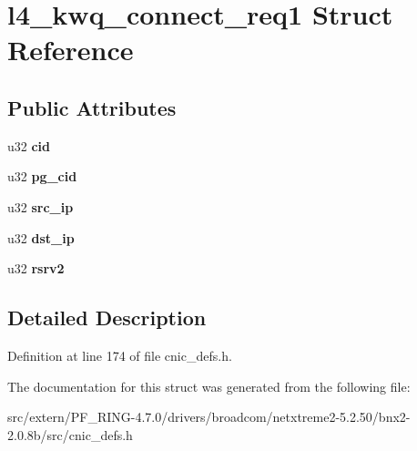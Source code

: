 \hypertarget{structl4__kwq__connect__req1}{
\section{l4\_\-kwq\_\-connect\_\-req1 Struct Reference}
\label{structl4__kwq__connect__req1}
}
\subsection*{Public Attributes}
\begin{DoxyCompactItemize}
\item 
\hypertarget{structl4__kwq__connect__req1_a1123d1000741e02479476778680c6e01}{
u32 {\bfseries cid}}
\label{structl4__kwq__connect__req1_a1123d1000741e02479476778680c6e01}

\item 
\hypertarget{structl4__kwq__connect__req1_a3bc954175aec4a9ec3cda5054e954c39}{
u32 {\bfseries pg\_\-cid}}
\label{structl4__kwq__connect__req1_a3bc954175aec4a9ec3cda5054e954c39}

\item 
\hypertarget{structl4__kwq__connect__req1_a2c3fad816dfd58e331d64d65eb005e70}{
u32 {\bfseries src\_\-ip}}
\label{structl4__kwq__connect__req1_a2c3fad816dfd58e331d64d65eb005e70}

\item 
\hypertarget{structl4__kwq__connect__req1_af30ee496ddfbd2d03a527261b3f261c9}{
u32 {\bfseries dst\_\-ip}}
\label{structl4__kwq__connect__req1_af30ee496ddfbd2d03a527261b3f261c9}

\item 
\hypertarget{structl4__kwq__connect__req1_aff61a0cc2f9eb5a43073a438ae78ff29}{
u32 {\bfseries rsrv2}}
\label{structl4__kwq__connect__req1_aff61a0cc2f9eb5a43073a438ae78ff29}

\end{DoxyCompactItemize}


\subsection{Detailed Description}


Definition at line 174 of file cnic\_\-defs.h.



The documentation for this struct was generated from the following file:\begin{DoxyCompactItemize}
\item 
src/extern/PF\_\-RING-\/4.7.0/drivers/broadcom/netxtreme2-\/5.2.50/bnx2-\/2.0.8b/src/cnic\_\-defs.h\end{DoxyCompactItemize}
